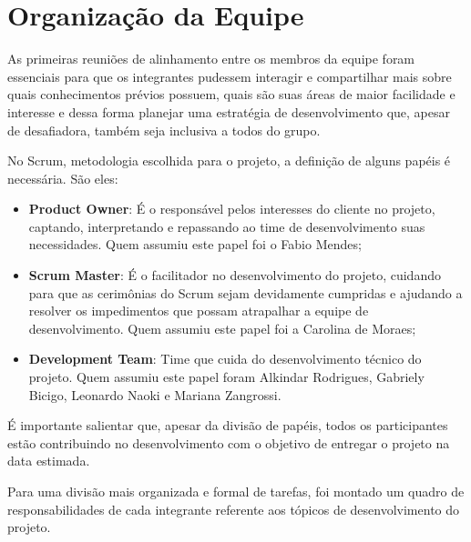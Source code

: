 \section{Organização da Equipe}
As primeiras reuniões de alinhamento entre os membros da equipe foram essenciais para que os integrantes pudessem interagir e compartilhar mais sobre quais conhecimentos prévios possuem, quais são suas áreas de maior facilidade e interesse e dessa forma planejar uma estratégia de desenvolvimento que, apesar de desafiadora, também seja inclusiva a todos do grupo. 

No Scrum, metodologia escolhida para o projeto, a definição de alguns papéis é necessária. São eles: 

\begin {itemize}
\item \textbf{Product Owner}: É o responsável pelos interesses do cliente no projeto, captando, interpretando e repassando ao time de desenvolvimento suas necessidades. Quem assumiu este papel foi o Fabio Mendes;

\item \textbf{Scrum Master}: É o facilitador no desenvolvimento do projeto, cuidando para que as cerimônias do Scrum sejam devidamente cumpridas e ajudando a resolver os impedimentos que possam atrapalhar a equipe de desenvolvimento. Quem assumiu este papel foi a Carolina de Moraes;

\item \textbf{Development Team}: Time que cuida do desenvolvimento técnico do projeto. Quem assumiu este papel foram Alkindar Rodrigues, Gabriely Bicigo, Leonardo Naoki e Mariana Zangrossi.

\end {itemize}

É importante salientar que, apesar da divisão de papéis, todos os participantes estão contribuindo no desenvolvimento com o objetivo de entregar o projeto na data estimada.

Para uma divisão mais organizada e formal de tarefas, foi montado um quadro de responsabilidades de cada integrante referente aos tópicos de desenvolvimento do projeto.


